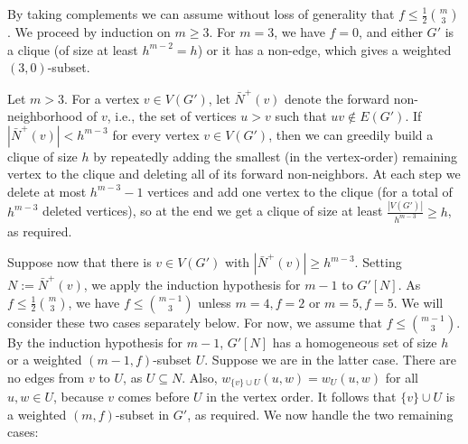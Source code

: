 \documentclass[11pt]{article}
\let\oldendproof\endproof
\renewenvironment{proof}[1][\proofname]{%
	\oldproof[\bf #1]%
}{\oldendproof}
\theoremstyle{plain}
\begin{document}
\begin{proof}[Proof of Lemma \ref{3-graphs induction}]
    By taking complements we can assume without loss of generality that $f \leq \frac{1}{2}\binom{m}{3}$. We proceed by induction on $m \geq 3$. For $m=3$, we have $f=0$, and either $G'$ is a clique (of size at least $h^{m-2} = h$) or it has a non-edge, which gives a weighted $(3,0)$-subset.  
    
    Let $m>3$. 
    For a vertex $v \in V(G')$, let $\bar{N}^+(v)$ denote the forward non-neighborhood of $v$, i.e., the set of vertices $u > v$ such that $uv \notin E(G')$. 
    If $|\bar{N}^+(v)| < h^{m-3}$ for every vertex $v \in V(G')$, then we can greedily build a clique of size $h$ by repeatedly adding the smallest (in the vertex-order) remaining vertex to the clique and deleting all of its forward non-neighbors. At each step we delete at most $h^{m-3}-1$ vertices and add one vertex to the clique (for a total of $h^{m-3}$ deleted vertices), so at the end we get a clique of size at least $\frac{|V(G')|}{h^{m-3}} \geq h$, as required. 
    
    Suppose now that there is $v \in V(G')$ with $|\bar{N}^+(v)| \geq h^{m-3}$. Setting $N := \bar{N}^+(v)$,
    we apply the induction hypothesis for $m-1$ to $G'[N]$.
    As $f \leq \frac{1}{2} \binom{m}{3}$, we have $f \leq \binom{m-1}{3}$ 
    unless $m=4,f=2$ or $m=5,f=5$. We will consider these two cases separately below. For now, we assume that $f \leq \binom{m-1}{3}$.
    By the induction hypothesis for $m-1$, $G'[N]$ has a homogeneous set of size $h$ or a weighted 
    $(m-1,f)$-subset $U$. 
    Suppose we are in the latter case. There are no edges from $v$ to $U$, as $U \subseteq N$. Also, $w_{\{v\} \cup U}(u,w) = w_U(u,w)$ for all $u,w \in U$, because $v$ comes before $U$ in the vertex order.  
    It follows that $\{v\} \cup U$ is a weighted $(m,f)$-subset in $G'$, as required. We now handle the two remaining cases:


\end{proof}
\end{document}
